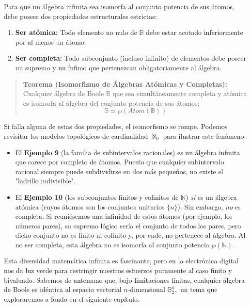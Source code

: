 Para que un álgebra infinita sea isomorfa al conjunto potencia de sus átomos, debe poseer dos propiedades estructurales estrictas:
\begin{enumerate}
    \item \textbf{Ser atómica:} Todo elemento no nulo de $\mathbb{B}$ debe estar acotado inferiormente por al menos un átomo.
    \item \textbf{Ser completa:} Todo subconjunto (incluso infinito) de elementos debe poseer un supremo y un ínfimo que pertenezcan obligatoriamente al álgebra.
\end{enumerate}

\begin{quote}\textbf{Teorema (Isomorfismo de Álgebras Atómicas y Completas):}\label{rep_stone_infinito}
Cualquier álgebra de Boole $\mathbb{B}$ que sea simultáneamente completa y atómica es isomorfa al álgebra del conjunto potencia de sus átomos:
\[ \mathbb{B} \simeq \wp(\mathit{Atom}(\mathbb{B})) \]
\end{quote}

Si falla alguna de estas dos propiedades, el isomorfismo se rompe. Podemos revisitar los modelos topológicos de cardinalidad $\aleph_0$ para ilustrar este fenómeno:
\begin{itemize}
    \item El \textbf{Ejemplo 9} (la familia de subintervalos racionales) es un álgebra infinita que carece por completo de átomos. Puesto que cualquier subintervalo racional siempre puede subdividirse en dos más pequeños, no existe el "ladrillo indivisible".
    \item El \textbf{Ejemplo 10} (los subconjuntos finitos y cofinitos de $\mathbb{N}$) \textit{sí} es un álgebra atómica (cuyos átomos son los conjuntos unitarios $\{n\}$). Sin embargo, \textit{no} es completa. Si reuniésemos una infinidad de estos átomos (por ejemplo, los números pares), su supremo lógico sería el conjunto de todos los pares, pero dicho conjunto no es finito ni cofinito y, por ende, no pertenece al álgebra. Al no ser completa, esta álgebra no es isomorfa al conjunto potencia $\wp(\mathbb{N}).$
\end{itemize}

Esta diversidad matemática infinita es fascinante, pero en la electrónica digital nos da luz verde para restringir nuestros esfuerzos puramente al caso finito y bivaluado. Sabemos de antemano que, bajo limitaciones finitas, cualquier álgebra de Boole es idéntica al espacio vectorial $n$-dimensional $\mathbb{B}_2^n,$ un tema que exploraremos a fondo en el siguiente capítulo.

